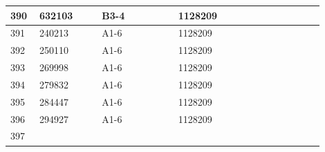 \documentclass[UTF8,10pt,a4paper,fontset=fandol]{ctexart}
\newcommand{\fieldvalue}[1]{#1}
\begin{document}
\begin{center}
\begin{tabular}{|p{0.08\linewidth}|p{0.18\linewidth}|p{0.22\linewidth}|p{0.22\linewidth}|p{0.20\linewidth}|}
\fieldvalue{390} &
\fieldvalue{632103} &
\fieldvalue{B3-4} &
\fieldvalue{1128209} & \\ \hline
\fieldvalue{391} &
\fieldvalue{240213} &
\fieldvalue{A1-6} &
\fieldvalue{1128209} & \\ \hline
\fieldvalue{392} &
\fieldvalue{250110} &
\fieldvalue{A1-6} &
\fieldvalue{1128209} & \\ \hline
\fieldvalue{393} &
\fieldvalue{269998} &
\fieldvalue{A1-6} &
\fieldvalue{1128209} & \\ \hline
\fieldvalue{394} &
\fieldvalue{279832} &
\fieldvalue{A1-6} &
\fieldvalue{1128209} & \\ \hline
\fieldvalue{395} &
\fieldvalue{284447} &
\fieldvalue{A1-6} &
\fieldvalue{1128209} & \\ \hline
\fieldvalue{396} &
\fieldvalue{294927} &
\fieldvalue{A1-6} &
\fieldvalue{1128209} & \\ \hline
\fieldvalue{397} &

\end{tabular}
\end{center}
\end{document}
